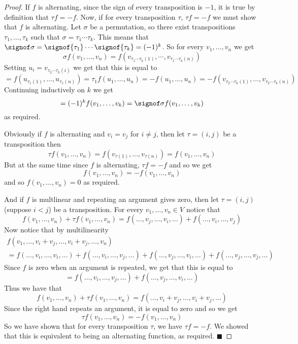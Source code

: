 \documentclass[10pt]{article}
\def\qed{%
    \ifmmode%
        \eqno\blacksquare%
    \else%
        \hskip1cm\allowbreak\hbox{}\nobreak\hfill$\blacksquare$%
    \fi%
}
\begin{document}
\begin{proof}

        If $f$ is alternating, since the sign of every transposition is $-1$, it is true by definition that $\tau f=-f$.
        Now, if for every transposition $\tau$, $\tau f=-f$ we must show that $f$ is alternating.
        Let $\sigma$ be a permutation, so there exist transpositions $\tau_1,\dots,\tau_k$ such that $\sigma=\tau_1\cdots\tau_k$.
        This means that $\signof\sigma=\signof{\tau_1}\cdots\signof{\tau_k}=(-1)^k$.
        So for every $v_1,\dots,v_n$ we get
        \[ \sigma f(v_1,\dots,v_n) = f(v_{\tau_1\cdots\tau_k(1)},\cdots,v_{\tau_1\cdots\tau_k(n)}) \]
        Setting $u_i=v_{\tau_2\cdots\tau_k(i)}$ we get that this is equal to
        \[ = f(u_{\tau_1(1)},\dots,u_{\tau_1(n)}) = \tau_1 f(u_1,\dots,u_n) = -f(u_1,\dots,u_n) = -f(v_{\tau_2\cdots\tau_k(1)},\dots,v_{\tau_2\cdots\tau_k(n)}) \]
        Continuing inductively on $k$ we get
        \[ = (-1)^kf(v_1,\dots,v_k) = \signof\sigma f(v_1,\dots,v_k) \]
        as required.

        Obviously if $f$ is alternating and $v_i=v_j$ for $i\neq j$, then let $\tau=(i,j)$ be a transposition then
        \[ \tau f(v_1,\dots,v_n)=f(v_{\tau(1)},\dots,v_{\tau(n)}) = f(v_1,\dots,v_n) \]
        But at the same time since $f$ is alternating, $\tau f=-f$ and so we get
        \[ f(v_1,\dots,v_n) = -f(v_1,\dots,v_n) \]
        and so $f(v_1,\dots,v_n)=0$ as required.

        And if $f$ is multlinear and repeating an argument gives zero, then let $\tau=(i,j)$ (suppose $i<j$) be a transposition.
        For every $v_1,\dots,v_n\in V$ notice that
        \[ f(v_1,\dots,v_n) + \tau f(v_1,\dots,v_n) = f(\dots,v_j,\dots,v_i,\dots) + f(\dots,v_i,\dots,v_j) \]
        Now notice that by multilinearity
        \begin{multline*}
            f(v_1,\dots,v_i+v_j,\dots,v_i+v_j,\dots,v_n) \\
            = f(\dots,v_i,\dots,v_i,\dots) + f(\dots,v_i,\dots,v_j,\dots) + f(\dots,v_j,\dots,v_i,\dots) + f(\dots,v_j,\dots,v_j,\dots)
        \end{multline*}
        Since $f$ is zero when an argument is repeated, we get that this is equal to
        \[ = f(\dots,v_i,\dots,v_j,\dots) + f(\dots,v_j,\dots,v_i,\dots) \]
        Thus we have that
        \[ f(v_1,\dots,v_n) + \tau f(v_1,\dots,v_n) = f(\dots,v_i+v_j,\dots,v_i+v_j,\dots) \]
        Since the right hand repeats an argument, it is equal to zero and so we get
        \[ \tau f(v_1,\dots,v_n) = -f(v_1,\dots,v_n) \]
        So we have shown that for every transposition $\tau$, we have $\tau f=-f$.
        We showed that this is equivalent to being an alternating function, as required.
        \qed

\end{proof}
\end{document}
